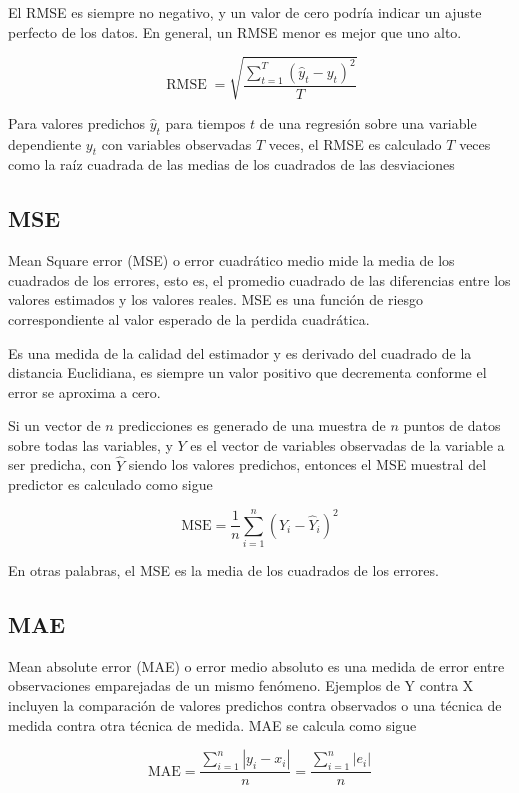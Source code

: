 El RMSE es siempre no negativo, y un valor de cero podría indicar un ajuste perfecto de los datos. En general, un RMSE menor es mejor que uno alto.

\[
\operatorname{RMSE}=\sqrt{\frac{\sum_{t=1}^{T}\left(\hat{y}_{t}-y_{t}\right)^{2}}{T}}
\] 

Para valores predichos $\hat{y}_t$ para tiempos $t$ de una regresión sobre una variable dependiente $y_t$ con variables observadas $T$ veces, el RMSE es calculado $T$ veces como la raíz cuadrada de las medias de los cuadrados de las desviaciones

\subsection{MSE}

Mean Square error (MSE) o error cuadrático medio mide la media de los cuadrados de los errores, esto es, el promedio cuadrado de las diferencias entre los valores estimados y los valores reales. MSE es una función de riesgo correspondiente al valor esperado de la perdida cuadrática.

Es una medida de la calidad del estimador y es derivado del cuadrado de la distancia Euclidiana, es siempre un valor positivo que decrementa conforme el error se aproxima a cero.

Si un vector de $n$ predicciones es generado de una muestra de $n$ puntos de datos sobre todas las variables, y $Y$ es el vector de variables observadas de la variable a ser predicha, con $\hat{Y}$ siendo los valores predichos, entonces el MSE muestral del predictor es calculado como sigue 

\[
\mathrm{MSE}=\frac{1}{n} \sum_{i=1}^{n}\left(Y_{i}-\hat{Y}_{i}\right)^{2}
\]

En otras palabras, el MSE es la media de los cuadrados de los errores. 

\subsection{MAE}
Mean absolute error (MAE) o error medio absoluto es una medida de error entre observaciones emparejadas de un mismo fenómeno. Ejemplos de Y contra X incluyen la comparación de valores predichos contra observados o una técnica de medida contra otra técnica de medida. MAE se calcula como sigue

\[
\mathrm{MAE}=\frac{\sum_{i=1}^{n}\left|y_{i}-x_{i}\right|}{n}=\frac{\sum_{i=1}^{n}\left|e_{i}\right|}{n}
\] 

